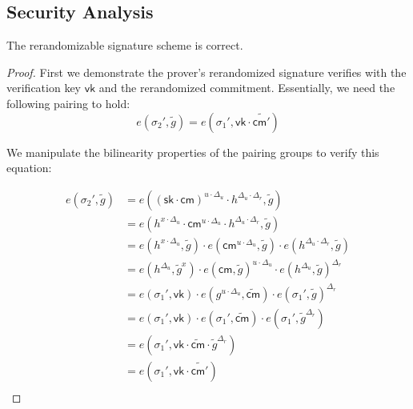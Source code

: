 \subsection{Security Analysis}

\begin{theorem}
The rerandomizable signature scheme is correct.
\end{theorem}


\begin{proof}
First we demonstrate the prover's rerandomized signature verifies with the verification key $\mathsf{vk}$ and the rerandomized commitment. Essentially, we need the following pairing to hold:
\[
    e(\sigma_2', \tilde{g}) = e(\sigma_1', \mathsf{vk} \cdot \widetilde{\mathsf{cm}'})
\]

We manipulate the bilinearity properties of the pairing groups to verify this equation:
    
\begin{align*}
    e(\sigma_2', \tilde{g}) &= e((\mathsf{sk} \cdot \mathsf{cm})^{u \cdot \Delta_u} \cdot h^{\Delta_u \cdot \Delta_r}, \tilde{g}) \\
    &= e(h^{x \cdot \Delta_u} \cdot \mathsf{cm}^{u \cdot \Delta_u} \cdot h^{\Delta_u \cdot \Delta_r}, \tilde{g}) \\
    &= e(h^{x \cdot \Delta_u}, \tilde{g}) \cdot e(\mathsf{cm}^{u \cdot \Delta_u}, \tilde{g}) \cdot e(h^{\Delta_u \cdot \Delta_r}, \tilde{g}) \\
    &= e(h^{\Delta_u}, \tilde{g}^x) \cdot e(\mathsf{cm}, \tilde{g})^{u \cdot \Delta_u} \cdot e(h^{\Delta_u}, \tilde{g})^{\Delta_r} \\
    &= e(\sigma_1', \mathsf{vk}) \cdot e(g^{u \cdot \Delta_u}, \widetilde{\mathsf{cm}}) \cdot e(\sigma_1', \tilde{g})^{\Delta_r} \\
    &= e(\sigma_1', \mathsf{vk}) \cdot e(\sigma_1', \widetilde{\mathsf{cm}}) \cdot e(\sigma_1', \tilde{g}^{\Delta_r}) \\
    &= e(\sigma_1', \mathsf{vk} \cdot \widetilde{\mathsf{cm}} \cdot \tilde{g}^{\Delta_r}) \\
    &= e(\sigma_1', \mathsf{vk} \cdot \widetilde{\mathsf{cm}'}) \\
\end{align*}
\end{proof}

